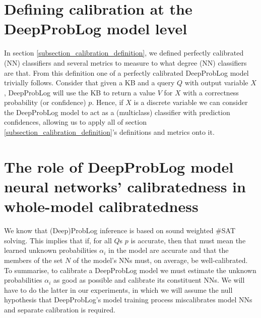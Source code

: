 \section{Defining calibration at the DeepProbLog model level}
In section \ref{subsection_calibration_definition}, we defined perfectly calibrated (NN) classifiers and several metrics to measure to what degree (NN) classifiers are that. From this definition one of a perfectly calibrated DeepProbLog model trivially follows. Consider that given a KB and a query $Q$ with output variable $X$, DeepProbLog will use the KB to return a value $V$ for $X$ with a correctness probability (or confidence) $p$. Hence, if $X$ is a discrete variable we can consider the DeepProbLog model to act as a (multiclass) classifier with prediction confidences, allowing us to apply all of section \ref{subsection_calibration_definition}'s definitions and metrics onto it.

\section{The role of DeepProbLog model neural networks' calibratedness in whole-model calibratedness}
We know that (Deep)ProbLog inference is based on sound weighted \#SAT solving. This implies that if, for all $Q$s $p$ is accurate, then that must mean the learned unknown probabilities $\alpha_{i}$ in the model are accurate and that the members of the set $N$ of the model's NNs must, on average, be well-calibrated. To summarise, to calibrate a DeepProbLog model we must estimate the unknown probabilities $\alpha_{i}$ as good as possible and calibrate its constituent NNs. We will have to do the latter in our experiments, in which we will assume the null hypothesis that DeepProbLog's model training process miscalibrates model NNs and separate calibration is required.

